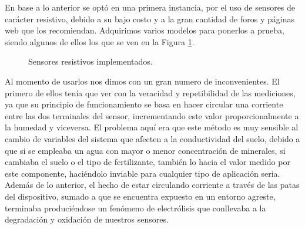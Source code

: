 \documentclass{article}
\begin{document}
En base a lo anterior se optó en una primera instancia, por el uso de sensores de carácter resistivo, debido a su bajo costo y a la gran cantidad de foros y páginas web que los recomiendan. Adquirimos varios modelos para ponerlos a prueba, siendo algunos de ellos los que se ven en la Figura \ref{fig:sensores_resistivos}. 

\begin{figure}[H]
    \centering
     \label{fig:res_1}
     \label{fig:res_2}
    \caption{Sensores resistivos implementados.}%
    \label{fig:sensores_resistivos}%
\end{figure}

Al momento de usarlos nos dimos con un gran numero de inconvenientes. El primero de ellos tenía que ver con la veracidad y repetibilidad de las mediciones, ya que su principio de funcionamiento se basa en hacer circular una corriente entre las dos terminales del sensor, incrementando este valor proporcionalmente a la humedad y viceversa. El problema aquí era que este método es muy sensible al cambio de variables del sistema que afecten a la conductividad del suelo, debido a que si se empleaba un agua con mayor o menor concentración de minerales, si cambiaba el suelo o el tipo de fertilizante, también lo hacia el valor medido por este componente, haciéndolo inviable para cualquier tipo de aplicación seria. Además de lo anterior, el hecho de estar circulando corriente a través de las patas del dispositivo, sumado a que se encuentra expuesto en un entorno agreste, terminaba produciéndose un fenómeno de electrólisis que conllevaba a la degradación y oxidación de nuestros sensores.
\end{document}
